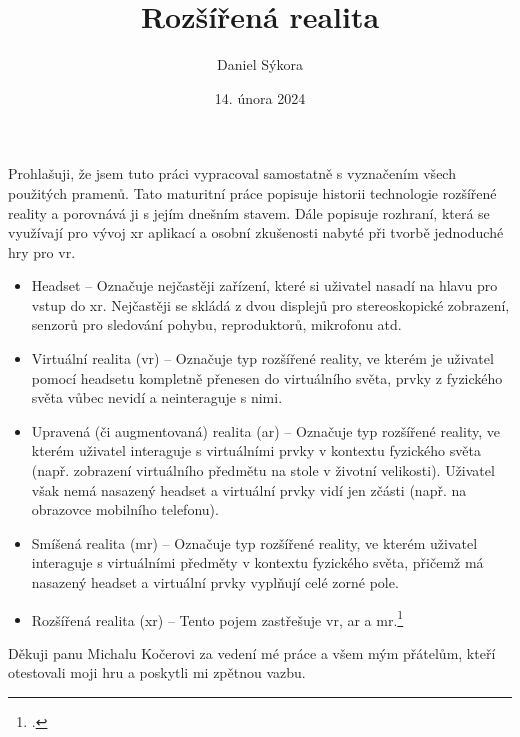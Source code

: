 \documentclass[12pt]{report}
\author{Daniel Sýkora}
\title{Rozšířená realita}
\date{14. února 2024}
\begin{document}
\mytitlepage
\prohlaseni
{
	Prohlašuji, že jsem tuto práci vypracoval samostatně s vyznačením všech použitých pramenů.
}
\abstrakt
{ %
	Tato maturitní práce popisuje historii technologie rozšířené reality a porovnává ji s jejím dnešním stavem. Dále popisuje rozhraní, která se využívají pro vývoj \gls{xr} aplikací a osobní zkušenosti nabyté při tvorbě jednoduché hry pro \gls{vr}.
}
{ %
	\begin{itemize}
		\item Headset -- Označuje nejčastěji zařízení, které si uživatel nasadí na hlavu pro vstup do \gls{xr}.
				Nejčastěji se skládá z dvou displejů pro stereoskopické zobrazení, senzorů pro sledování pohybu,
				reproduktorů, mikrofonu atd.

		\item Virtuální realita (\gls{vr}) -- Označuje typ rozšířené reality, ve kterém je uživatel pomocí headsetu
				kompletně přenesen do virtuálního světa, prvky z fyzického světa vůbec nevidí a neinteraguje s nimi.

		\item Upravená (či augmentovaná) realita (\gls{ar}) -- Označuje typ rozšířené reality, ve kterém uživatel interaguje
				s virtuálními prvky v kontextu fyzického světa (např. zobrazení virtuálního předmětu na stole v životní velikosti).
				Uživatel však nemá nasazený headset a virtuální prvky vidí jen zčásti (např. na obrazovce mobilního telefonu).

		\item Smíšená realita (\gls{mr}) -- Označuje typ rozšířené reality, ve kterém uživatel interaguje s virtuálními předměty
				v kontextu fyzického světa, přičemž má nasazený headset a virtuální prvky vyplňují celé zorné pole.

		\item Rozšířená realita (\gls{xr}) -- Tento pojem zastřešuje \gls{vr}, \gls{ar} a \gls{mr}.\footcite{xr_disambiguation}
	\end{itemize}
}
\podekovani
{
	Děkuji panu Michalu Kočerovi za vedení mé práce a všem mým přátelům, kteří otestovali moji hru a poskytli mi zpětnou vazbu.
}

\tableofcontents
\newpage






\nocite{*}

\appendix
{}

\printbibliography
{}

\printglossary[title={Zkratky}]

\listoffigures
{}
\end{document}
